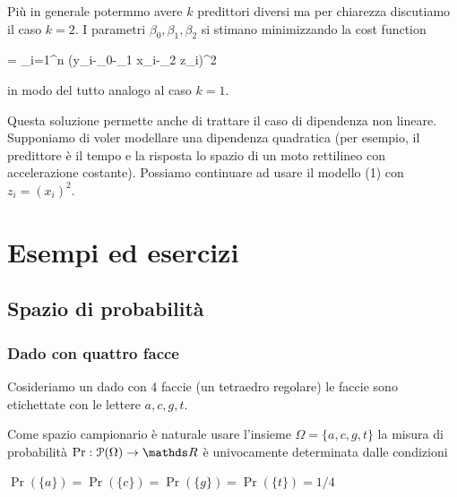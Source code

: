 \documentclass[11pt,openany]{book}
\def\RR{\mathds R}
\def\P{\EuScript P}
\begin{document}

Più in generale potermmo avere $k$ predittori diversi ma per chiarezza discutiamo il caso $k=2$.
I parametri $\beta_0,\beta_1,\beta_2$ si stimano minimizzando la cost function

{=}
{\sum_{i=1}^n (y_i-\beta_0-\beta_1 x_i-\beta_2 z_i)^2}

in modo del tutto analogo al caso $k=1$.

Questa soluzione permette anche di trattare il caso di dipendenza non lineare.
Supponiamo di voler modellare una dipendenza quadratica (per esempio, il predittore è il tempo e la risposta lo spazio di un moto rettilineo con accelerazione costante).
Possiamo continuare ad usare il modello (1) con $z_i=(x_i)^2$.



\chapter{Esempi ed esercizi}
\pagestyle{plain}
\label{ch2}


\clearpage\section{Spazio di probabilità}

\subsection{Dado con quattro facce}
\label{tetraedro}

Cosideriamo un dado con $4$ faccie (un tetraedro regolare) le faccie sono etichettate con le lettere $a, c, g, t$. 

Come spazio campionario è naturale usare l'insieme $\Omega=\{a, c, g, t\}$ la misura di probabilità $\Pr:\P(\Omega)\to\RR$ è univocamente determinata dalle condizioni

$\Pr(\{a\})=\Pr(\{c\})=\Pr(\{g\})=\Pr(\{t\})=1/4$
\end{document}

